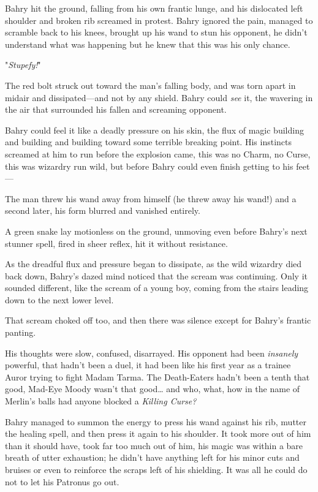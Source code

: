 Bahry hit the ground, falling from his own frantic lunge, and his dislocated 
left shoulder and broken rib screamed in protest. Bahry ignored the pain, 
managed to scramble back to his knees, brought up his wand to stun his 
opponent, he didn't understand what was happening but he knew that this was his 
only chance.

"\emph{Stupefy!}"

The red bolt struck out toward the man's falling body, and was torn apart in 
midair and dissipated---and not by any shield. Bahry could \emph{see} it, the 
wavering in the air that surrounded his fallen and screaming opponent.

Bahry could feel it like a deadly pressure on his skin, the flux of magic 
building and building and building toward some terrible breaking point. His 
instincts screamed at him to run before the explosion came, this was no Charm, 
no Curse, this was wizardry run wild, but before Bahry could even finish 
getting to his feet---

The man threw his wand away from himself (he threw away his wand!) and a second 
later, his form blurred and vanished entirely.

A green snake lay motionless on the ground, unmoving even before Bahry's next 
stunner spell, fired in sheer reflex, hit it without resistance.

As the dreadful flux and pressure began to dissipate, as the wild wizardry died 
back down, Bahry's dazed mind noticed that the scream was continuing. Only it 
sounded different, like the scream of a young boy, coming from the stairs 
leading down to the next lower level.

That scream choked off too, and then there was silence except for Bahry's 
frantic panting.

His thoughts were slow, confused, disarrayed. His opponent had been 
\emph{insanely} powerful, that hadn't been a duel, it had been like his first 
year as a trainee Auror trying to fight Madam Tarma. The Death-Eaters hadn't 
been a tenth that good, Mad-Eye Moody wasn't that good{\ldots} and who, what, 
how in the name of Merlin's balls had anyone blocked a \emph{Killing Curse?}

Bahry managed to summon the energy to press his wand against his rib, mutter 
the healing spell, and then press it again to his shoulder. It took more out of 
him than it should have, took far too much out of him, his magic was within a 
bare breath of utter exhaustion; he didn't have anything left for his minor 
cuts and bruises or even to reinforce the scraps left of his shielding. It was 
all he could do not to let his Patronus go out.

